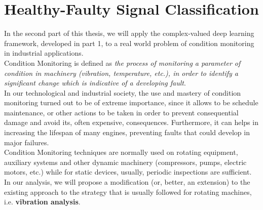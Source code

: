 \documentclass[../main.tex]{subfiles}
\begin{document}
	
\chapter{Healthy-Faulty Signal Classification}
\label{ch:healthy_faulty}

In the second part of this thesis, we will apply the complex-valued deep learning framework, developed in part 1, to a real world problem of condition monitoring in industrial applications.\\
Condition Monitoring is defined as \textit{the process of monitoring a parameter of condition in machinery (vibration, temperature, etc.), in order to identify a significant change which is indicative of a developing fault}.\\
In our technological and industrial society, the use and mastery of condition monitoring turned out to be of extreme importance, since it allows to be schedule maintenance, or other actions to be taken in order to prevent consequential damage and avoid its, often expensive, consequences. Furthermore, it can helps in increasing the lifespan of many engines, preventing faults that could develop in major failures.\\	
Condition Monitoring techniques are normally used on rotating equipment, auxiliary systems and other dynamic machinery (compressors, pumps, electric motors, etc.) while for static devices, usually, periodic inspections are sufficient.\\
In our analysis, we will propose a modification (or, better, an extension) to the existing approach to the strategy that is usually followed for rotating machines, i.e. \textbf{vibration analysis}.\\
\end{document}
